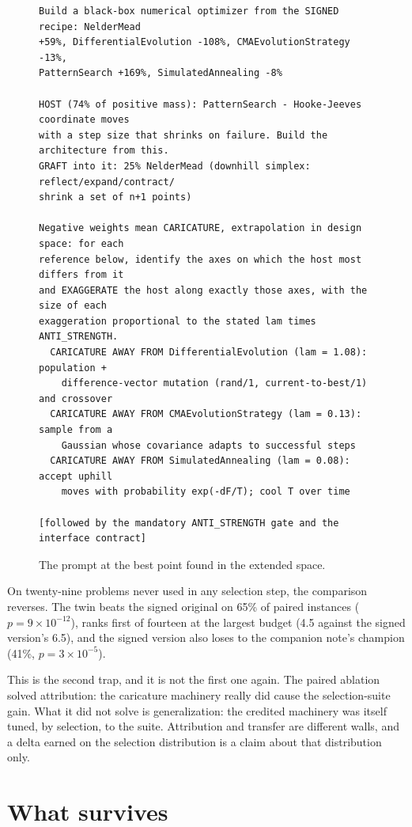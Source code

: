 \documentclass[11pt]{article}
\begin{document}
\begin{figure}[t]
\scriptsize
\begin{verbatim}
Build a black-box numerical optimizer from the SIGNED recipe: NelderMead
+59%, DifferentialEvolution -108%, CMAEvolutionStrategy -13%,
PatternSearch +169%, SimulatedAnnealing -8%

HOST (74% of positive mass): PatternSearch - Hooke-Jeeves coordinate moves
with a step size that shrinks on failure. Build the architecture from this.
GRAFT into it: 25% NelderMead (downhill simplex: reflect/expand/contract/
shrink a set of n+1 points)

Negative weights mean CARICATURE, extrapolation in design space: for each
reference below, identify the axes on which the host most differs from it
and EXAGGERATE the host along exactly those axes, with the size of each
exaggeration proportional to the stated lam times ANTI_STRENGTH.
  CARICATURE AWAY FROM DifferentialEvolution (lam = 1.08): population +
    difference-vector mutation (rand/1, current-to-best/1) and crossover
  CARICATURE AWAY FROM CMAEvolutionStrategy (lam = 0.13): sample from a
    Gaussian whose covariance adapts to successful steps
  CARICATURE AWAY FROM SimulatedAnnealing (lam = 0.08): accept uphill
    moves with probability exp(-dF/T); cool T over time

[followed by the mandatory ANTI_STRENGTH gate and the interface contract]
\end{verbatim}
\caption{The prompt at the best point found in the extended space.}
\label{fig:cprompt}
\end{figure}

On twenty-nine problems never used in any selection step, the comparison
reverses. The twin beats the signed original on 65\% of paired instances
($p = 9\times10^{-12}$), ranks first of fourteen at the largest budget
(4.5 against the signed version's 6.5), and the signed version also loses
to the companion note's champion (41\%, $p = 3\times10^{-5}$).

This is the second trap, and it is not the first one again. The paired
ablation solved attribution: the caricature machinery really did cause the
selection-suite gain. What it did not solve is generalization: the credited
machinery was itself tuned, by selection, to the suite. Attribution and
transfer are different walls, and a delta earned on the selection
distribution is a claim about that distribution only.

\section{What survives}
\end{document}
